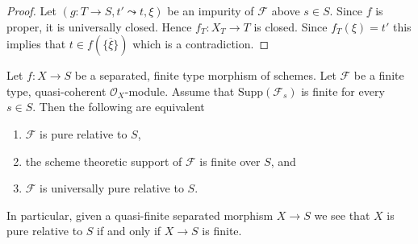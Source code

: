 \begin{proof}
Let $(g : T \to S, t' \leadsto t, \xi)$ be an impurity of $\mathcal{F}$
above $s \in S$. Since $f$ is proper, it is universally closed. Hence
$f_T : X_T \to T$ is closed. Since $f_T(\xi) = t'$ this implies that
$t \in f(\overline{\{\xi\}})$ which is a contradiction.
\end{proof}

\begin{lemma}
\label{lemma-quasi-finite-pure}
Let $f : X \to S$ be a separated, finite type morphism of schemes.
Let $\mathcal{F}$ be a finite type, quasi-coherent $\mathcal{O}_X$-module.
Assume that $\text{Supp}(\mathcal{F}_s)$ is finite for every $s \in S$.
Then the following are equivalent
\begin{enumerate}
\item $\mathcal{F}$ is pure relative to $S$,
\item the scheme theoretic support of $\mathcal{F}$ is finite over $S$, and
\item $\mathcal{F}$ is universally pure relative to $S$.
\end{enumerate}
In particular, given a quasi-finite separated morphism $X \to S$ we see
that $X$ is pure relative to $S$ if and only if $X \to S$ is finite.
\end{lemma}

